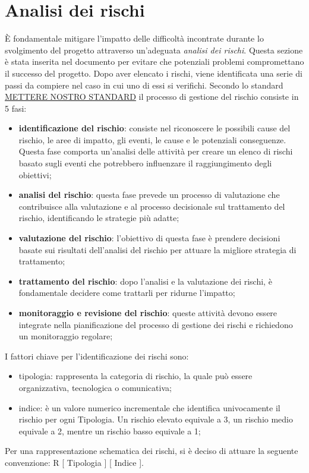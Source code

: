\section{Analisi dei rischi}
È fondamentale mitigare l'impatto delle difficoltà incontrate durante lo svolgimento del progetto attraverso un'adeguata \textit{analisi dei rischi}. Questa sezione è stata inserita nel documento per evitare che potenziali problemi compromettano il successo del progetto.
Dopo aver elencato i rischi, viene identificata una serie di passi da compiere nel caso in cui uno di essi si verifichi. Secondo lo standard \uline{METTERE NOSTRO STANDARD} il processo di gestione del rischio consiste in 5 fasi:
\begin{itemize}
    \item \textbf{identificazione del rischio}: consiste nel riconoscere le possibili cause del rischio, le aree di impatto, gli eventi, le cause e le potenziali conseguenze. Questa fase comporta un'analisi delle attività per creare un elenco di rischi basato sugli eventi che potrebbero influenzare il raggiungimento degli obiettivi;

    \item \textbf{analisi del rischio}: questa fase prevede un processo di valutazione che contribuisce alla valutazione e al processo decisionale sul trattamento del rischio, identificando le strategie più adatte;
    
    \item \textbf{valutazione del rischio}: l'obiettivo di questa fase è prendere decisioni basate sui risultati dell'analisi del rischio per attuare la migliore strategia di trattamento;
    
    \item \textbf{trattamento del rischio}: dopo l'analisi e la valutazione dei rischi, è fondamentale decidere come trattarli per ridurne l'impatto;
    
    \item \textbf{monitoraggio e revisione del rischio}: queste attività devono essere integrate nella pianificazione del processo di gestione dei rischi e richiedono un monitoraggio regolare;
    
\end{itemize}
I fattori chiave per l'identificazione dei rischi sono:
\begin{itemize}
    \item tipologia: rappresenta la categoria di rischio, la quale può essere organizzativa, tecnologica o comunicativa;
    \item indice: è un valore numerico incrementale che identifica univocamente il rischio per ogni Tipologia. Un rischio elevato equivale a 3, un rischio medio equivale a 2, mentre un rischio basso equivale a 1;
\end{itemize}
Per una rappresentazione schematica dei rischi, si è deciso di attuare la seguente convenzione: R [ Tipologia ] [ Indice ].

